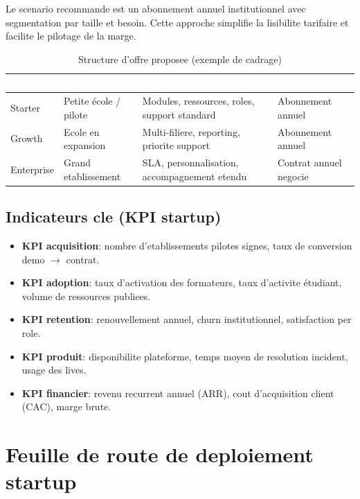 \documentclass[12pt,a4paper,oneside]{report}
\begin{document}
Le scenario recommande est un abonnement annuel institutionnel avec segmentation par taille et besoin. Cette approche simplifie la lisibilite tarifaire et facilite le pilotage de la marge.

\begin{table}[H]
\centering
\caption{Structure d'offre proposee (exemple de cadrage)}
\label{tab:offre_pricing}
\begin{tabular}{|p{3.2cm}|p{3.4cm}|p{4.0cm}|p{2.0cm}|}
\hline
\rowcolor{ustoblue}
\textcolor{white}{Formule} & \textcolor{white}{Cible} & \textcolor{white}{Valeur livree} & \textcolor{white}{Mode de prix} \\
\hline
Starter & Petite école / pilote & Modules, ressources, roles, support standard & Abonnement annuel \\
\hline
Growth & Ecole en expansion & Multi-filiere, reporting, priorite support & Abonnement annuel \\
\hline
Enterprise & Grand etablissement & SLA, personnalisation, accompagnement etendu & Contrat annuel negocie \\
\hline
\end{tabular}
\end{table}

\subsection{Indicateurs cle (KPI startup)}

\begin{itemize}
  \item \textbf{KPI acquisition}: nombre d'etablissements pilotes signes, taux de conversion demo $\rightarrow$ contrat.
  \item \textbf{KPI adoption}: taux d'activation des formateurs, taux d'activite étudiant, volume de ressources publiees.
  \item \textbf{KPI retention}: renouvellement annuel, churn institutionnel, satisfaction per role.
  \item \textbf{KPI produit}: disponibilite plateforme, temps moyen de resolution incident, usage des lives.
  \item \textbf{KPI financier}: revenu recurrent annuel (ARR), cout d'acquisition client (CAC), marge brute.
\end{itemize}

\section{Feuille de route de deploiement startup}
\end{document}
